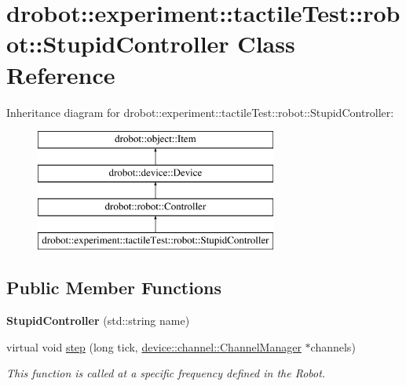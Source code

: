 \hypertarget{classdrobot_1_1experiment_1_1tactileTest_1_1robot_1_1StupidController}{\section{drobot\-:\-:experiment\-:\-:tactile\-Test\-:\-:robot\-:\-:Stupid\-Controller Class Reference}
\label{classdrobot_1_1experiment_1_1tactileTest_1_1robot_1_1StupidController}
}
Inheritance diagram for drobot\-:\-:experiment\-:\-:tactile\-Test\-:\-:robot\-:\-:Stupid\-Controller\-:\begin{figure}[H]
\begin{center}
\leavevmode
\includegraphics[height=4.000000cm]{classdrobot_1_1experiment_1_1tactileTest_1_1robot_1_1StupidController}
\end{center}
\end{figure}
\subsection*{Public Member Functions}
\begin{DoxyCompactItemize}
\item 
\hypertarget{classdrobot_1_1experiment_1_1tactileTest_1_1robot_1_1StupidController_a86aa02445fdd21422e7b66d5d233f3e5}{{\bfseries Stupid\-Controller} (std\-::string name)}\label{classdrobot_1_1experiment_1_1tactileTest_1_1robot_1_1StupidController_a86aa02445fdd21422e7b66d5d233f3e5}

\item 
virtual void \hyperlink{classdrobot_1_1experiment_1_1tactileTest_1_1robot_1_1StupidController_af18d7430f030f3cf5ce4e3d088e21ffa}{step} (long tick, \hyperlink{classdrobot_1_1device_1_1channel_1_1ChannelManager}{device\-::channel\-::\-Channel\-Manager} $\ast$channels)
\begin{DoxyCompactList}\small\item\em This function is called at a specific frequency defined in the Robot. \end{DoxyCompactList}\end{DoxyCompactItemize}
